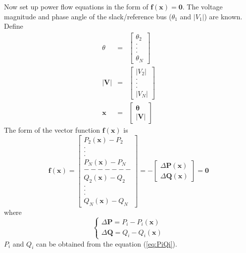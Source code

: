 \documentclass[12pt]{article}
\begin{document}
Now set up power flow equations in the form of $\mathbf{f}\left (\mathbf{x} \right )=\mathbf{0}$.
The voltage magnitude and phase angle of the slack/reference bus ($\theta_{1}$
and $|V_{1}|$) are known.
\newline
\newline
\noindent
Define
\begin{eqnarray}
\theta &=&\left [ \begin{array}{c} \theta{_2}\\.\\.\\.\\ \theta_{N} \end{array} \right] \\
|\mathbf{V}| &=&\left [ \begin{array}{c} |V_{2}| \\.\\.\\.\\|V_{N}| \end{array} \right]\\
\mathbf{x}  &=&\left [ \begin{array}{c} \boldsymbol{\theta}\\|\mathbf{V}| \end{array} \right]
\end{eqnarray}
The form of the vector function $\mathbf{f}(\mathbf{x})$ is
\begin{equation}
\label{eq:RHS}
\mathbf{f}\left (\mathbf{x} \right ) = \left [ \begin{array}{c} P_{2}\left (
\mathbf{x} \right ) - P_{2} \\.\\.\\.\\ P_{N}\left ( \mathbf{x} \right ) - P_{N}
\\-------\\Q_{2}\left ( \mathbf{x} \right ) - Q_{2} \\.\\.\\.\\ Q_{N}\left (
\mathbf{x} \right ) - Q_{N} \end{array} \right ] =- \left [ \begin{array}{c} \Delta \mathbf{P}\left ( \mathbf{x} \right ) \\ \Delta \mathbf{Q}\left ( \mathbf{x} \right ) \end{array} \right ] = \mathbf{0}
\end{equation}
where 
\begin{equation}\label{eq:DeltaPQ}
\begin{cases}
\Delta\mathbf{P} = P_{i} - P_{i}\left ( \mathbf{x} \right )  \\
\Delta\mathbf{Q} = Q_{i} - Q_{i}\left ( \mathbf{x} \right ) 
\end{cases}
\end{equation}
$P_{i}$ and $Q_i$ can be obtained from the equation (\ref{eq:PiQi}).
\end{document}
